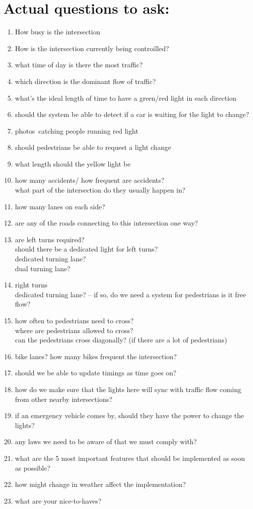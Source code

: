\documentclass[letterpaper]{article}
\begin{document}
\section{Actual questions to ask:}
\begin{enumerate}
 \item How busy is the intersection
 \item How is the intersection currently being controilled?
 \item what time of day is there the most traffic?
 \item which direction is the dominant flow of traffic?
 \item what's the ideal length of time to have a green/red light in each direction
 \item should the system be able to detect if a car is waiting for the light to change?
 \item photos\ catching people running red light
 \item should pedestrians be able to request a light change
 \item what length should the yellow light be
 \item how many accidents/ how frequent are accidents?\\
       what part of the intersection do they usually happen in?
 \item how many lanes on each side?
 \item are any of the roads connecting to this intersection one way?
 \item are left turns required?\\
       should there be a dedicated light for left turns?\\
       dedicated turning lane?\\
       dual turning lane?
 \item right turns\\
       dedicated turning lane? -- if so, do we need a system for pedestrians
       is it free flow?
       
 \item how often to pedestrians need to cross?\\
       where are pedestrians allowed to cross?\\
       can the pedestrians cross diagonally? (if there are a lot of pedestrians)
 \item bike lanes? how many bikes frequent the intersection?
 \item should we be able to update timings as time goes on?
 \item how do we make sure that the lights here will sync with traffic flow
       coming from other nearby intersections?
 \item if an emergency vehicle comes by, should they have the power to change the lights?
 \item any laws we need to be aware of that we must comply with?
 \item what are the 5 most important features that should be implemented as soon as possible?
 \item how might change in weather affect the implementation?
 \item what are your nice-to-haves?
       
       
\end{enumerate}
\end{document}
